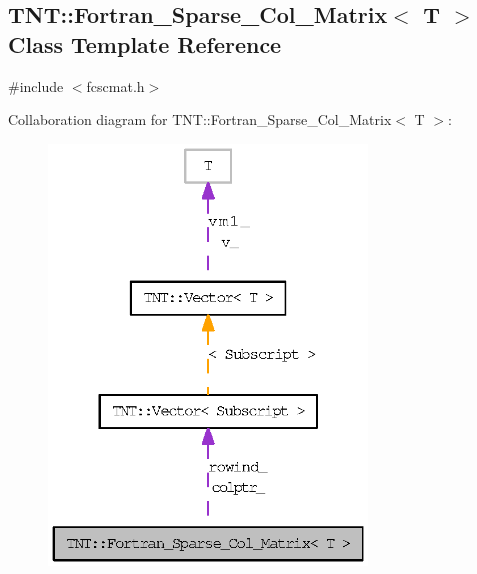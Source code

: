 \subsection{TNT::Fortran\_\-Sparse\_\-Col\_\-Matrix$<$ T $>$ Class Template Reference}
\label{class_t_n_t_1_1_fortran___sparse___col___matrix}


{\ttfamily \#include $<$fcscmat.h$>$}



Collaboration diagram for TNT::Fortran\_\-Sparse\_\-Col\_\-Matrix$<$ T $>$:
\nopagebreak
\begin{figure}[H]
\begin{center}
\leavevmode
\includegraphics[width=240pt]{class_t_n_t_1_1_fortran___sparse___col___matrix__coll__graph}
\end{center}
\end{figure}
